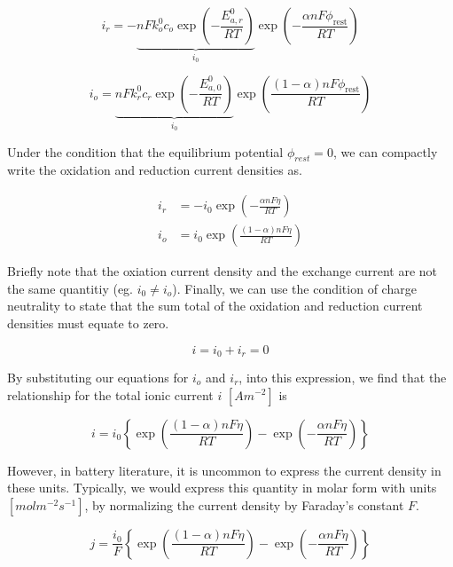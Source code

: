 \documentclass[lettersize,journal]{IEEEtran}
\begin{document}
\begin{equation}
i_{r}=-\underbrace{n F k_{o}^{0} c_{o} \exp \left(-\frac{E_{a, r}^{0}}{R T}\right)}_{i_0} \exp \left(-\frac{\alpha n F \phi_{\mathrm{rest}}}{R T}\right)
\end{equation}

\begin{equation}
i_{o}=\underbrace{n F k_{r}^{0} c_{r} \exp \left(-\frac{E_{a, 0}^{0}}{R T}\right)}_{i_0} \exp \left(\frac{(1-\alpha) n F \phi_{\mathrm{rest}}}{R T}\right)
\end{equation}

\noindent Under the condition that the equilibrium potential $\phi_{rest} = 0$, we can compactly write the oxidation and reduction current densities as.

\begin{equation}
\begin{aligned}
i_{r} &=-i_{0} \exp \left(-\frac{\alpha n F \eta}{R T}\right) \\
i_{o} &=i_{0} \exp \left(\frac{(1-\alpha) n F \eta}{R T}\right)
\end{aligned}
\end{equation}

\noindent Briefly note that the oxiation current density and the exchange current are not the same quantitiy (eg. $i_0 \ne i_o$). Finally, we can use the condition of charge neutrality to state that the sum total of the oxidation and reduction current densities must equate to zero.

\begin{equation}
i=i_{0}+i_{r}=0
\end{equation}

\noindent By substituting our equations for $i_o$ and $i_r$, into this expression, we find that the relationship for the total ionic current $i$  $\left[ Am^{-2} \right]$ is

\begin{equation}
i=i_{0}\left\{\exp \left(\frac{(1-\alpha) n F \eta}{R T}\right)-\exp \left(-\frac{\alpha n F \eta}{R T}\right)\right\}
\end{equation}

\noindent However, in battery literature, it is uncommon to express the current density in these units. Typically, we would express this quantity in molar form with units $\left[ mol m^{-2} s^{-1} \right]$, by normalizing the current density by Faraday's constant $F$.


\begin{equation}
j=\frac{i_{0}}{F}\left\{\exp \left(\frac{(1-\alpha) n F \eta}{R T}\right)-\exp \left(-\frac{\alpha n F \eta}{R T}\right)\right\}
\end{equation}
\end{document}

